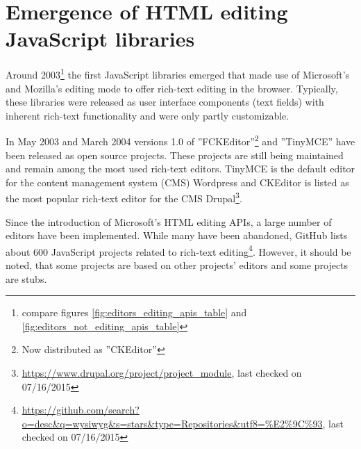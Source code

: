 \section{Emergence of HTML editing JavaScript libraries}

Around 2003\footnote{compare figures \ref{fig:editors_editing_apis_table} and \ref{fig:editors_not_editing_apis_table}} the first JavaScript libraries emerged that made use of Microsoft's and Mozilla's editing mode to offer rich-text editing in the browser. Typically, these libraries were released as user interface components (text fields) with inherent rich-text functionality and were only partly customizable.

In May 2003 and March 2004 versions 1.0 of ''FCKEditor''\footnote{Now distributed as ''CKEditor''} and ''TinyMCE'' have been released as open source projects. These projects are still being maintained and remain among the most used rich-text editors. TinyMCE is the default editor for the content management system (CMS) Wordpress and CKEditor is listed as the most popular rich-text editor for the CMS Drupal\footnote{\url{https://www.drupal.org/project/project\_module}, last checked on 07/16/2015}. 

Since the introduction of Microsoft's HTML editing APIs, a large number of editors have been implemented. While many have been abandoned, GitHub lists about 600 JavaScript projects related to rich-text editing\footnote{\url{https://github.com/search?o=desc\&q=wysiwyg\&s=stars\&type=Repositories\&utf8=\%E2\%9C\%93}, last checked on 07/16/2015}. However, it should be noted, that some projects are based on other projects' editors and some projects are stubs. %

